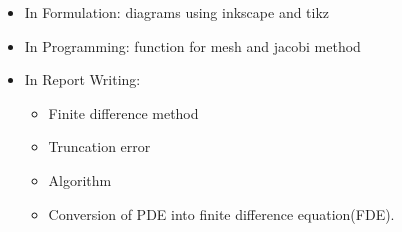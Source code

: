 	\begin{itemize}
		\item In Formulation: diagrams using inkscape and tikz
		\item  In Programming: function for mesh and jacobi method
		
		\item  In Report Writing: 
			\begin{itemize}
				\item  Finite difference method
				\item  Truncation error
				\item  Algorithm 
				\item Conversion of PDE into finite difference equation(FDE).
			\end{itemize}
	\end{itemize}


	